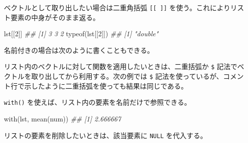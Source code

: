 \documentclass[
  letterpaper,
  xelatex,
  ja=standard, xelatex]{bxjsbook}
\newenvironment{Shaded}{\begin{snugshade}}{\end{snugshade}}
\newcommand{\ConstantTok}[1]{\textcolor[rgb]{0.56,0.35,0.01}{#1}}
\newcommand{\DecValTok}[1]{\textcolor[rgb]{0.68,0.00,0.00}{#1}}
\newcommand{\DocumentationTok}[1]{\textcolor[rgb]{0.37,0.37,0.37}{\textit{#1}}}
\newcommand{\FunctionTok}[1]{\textcolor[rgb]{0.28,0.35,0.67}{#1}}
\newcommand{\NormalTok}[1]{\textcolor[rgb]{0.00,0.23,0.31}{#1}}
\newcommand{\OtherTok}[1]{\textcolor[rgb]{0.00,0.23,0.31}{#1}}
\newcommand{\SpecialCharTok}[1]{\textcolor[rgb]{0.37,0.37,0.37}{#1}}
\newcommand{\StringTok}[1]{\textcolor[rgb]{0.13,0.47,0.30}{#1}}
\begin{document}
ベクトルとして取り出したい場合は二重角括弧 \texttt{{[}{[}\ {]}{]}}
を使う。これによりリスト要素の中身がそのまま返る。

\begin{Shaded}
\begin{Highlighting}[]
\NormalTok{lst[[}\DecValTok{2}\NormalTok{]]}
\DocumentationTok{\#\# [1] 3 3 2}
\FunctionTok{typeof}\NormalTok{(lst[[}\DecValTok{2}\NormalTok{]])}
\DocumentationTok{\#\# [1] "double"}
\end{Highlighting}
\end{Shaded}

名前付きの場合は次のように書くこともできる。

\begin{Shaded}
\end{Shaded}

リスト内のベクトルに対して関数を適用したいときは、二重括弧か \texttt{\$}
記法でベクトルを取り出してから利用する。次の例では \texttt{\$}
記法を使っているが、コメント行で示したように二重括弧を使っても結果は同じである。

\begin{Shaded}
\end{Shaded}

\texttt{with()} を使えば、リスト内の要素を名前だけで参照できる。

\begin{Shaded}
\begin{Highlighting}[]
\FunctionTok{with}\NormalTok{(lst, }\FunctionTok{mean}\NormalTok{(num))}
\DocumentationTok{\#\# [1] 2.666667}
\end{Highlighting}
\end{Shaded}

リストの要素を削除したいときは、該当要素に \texttt{NULL} を代入する。

\begin{Shaded}
\end{Shaded}
\end{document}
